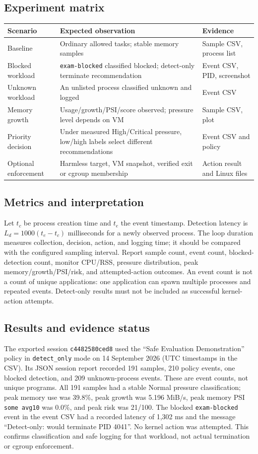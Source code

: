 \documentclass[12pt,a4paper]{article}
\newcommand{\code}[1]{\texttt{#1}}
\begin{document}
\subsection{Experiment matrix}
\begin{tabularx}{\textwidth}{p{}X X}
\toprule Scenario & Expected observation & Evidence\\\midrule
Baseline & Ordinary allowed tasks; stable memory samples & Sample CSV, process list\\
Blocked workload & \code{exam-blocked} classified blocked; detect-only terminate recommendation & Event CSV, PID, screenshot\\
Unknown workload & An unlisted process classified unknown and logged & Event CSV\\
Memory growth & Usage/growth/PSI/score observed; pressure level depends on VM & Sample CSV, plot\\
Priority decision & Under measured High/Critical pressure, low/high labels select different recommendations & Event CSV and policy\\
Optional enforcement & Harmless target, VM snapshot, verified exit or cgroup membership & Action result and Linux files\\
\bottomrule
\end{tabularx}

\subsection{Metrics and interpretation}
Let $t_c$ be process creation time and $t_e$ the event timestamp. Detection latency is $L_d=1000(t_e-t_c)$ milliseconds for a newly observed process. The loop duration measures collection, decision, action, and logging time; it should be compared with the configured sampling interval. Report sample count, event count, blocked-detection count, monitor CPU/RSS, pressure distribution, peak memory/growth/PSI/risk, and attempted-action outcomes. An event count is not a count of unique applications: one application can spawn multiple processes and repeated events. Detect-only results must not be included as successful kernel-action attempts.

\subsection{Results and evidence status}
The exported session \code{c4482580ced8} used the ``Safe Evaluation Demonstration'' policy in \code{detect\_only} mode on 14 September 2026 (UTC timestamps in the CSV). Its JSON session report recorded 191 samples, 210 policy events, one blocked detection, and 209 unknown-process events. These are event counts, not unique programs. All 191 samples had a stable Normal pressure classification; peak memory use was 39.8\%, peak growth was 5.196 MiB/s, peak memory PSI \code{some avg10} was 0.0\%, and peak risk was 21/100. The blocked \code{exam-blocked} event in the event CSV had a recorded latency of 1,302 ms and the message ``Detect-only: would terminate PID 4041''. No kernel action was attempted. This confirms classification and safe logging for that workload, not actual termination or cgroup enforcement.
\end{document}
